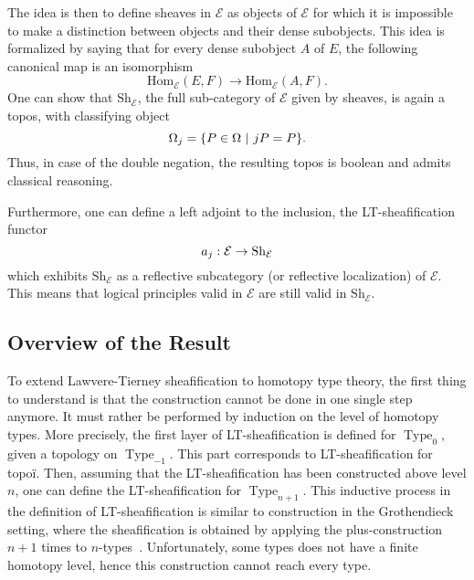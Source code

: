 \documentclass[preprint,9pt,numbers]{sigplanconf}
\DeclareMathOperator{\Type}{Type}
\newcommand \E {\mathcal{E}}
\newcommand \Hom[1] {\mathrm{Hom}_{#1}}
\newcommand \Sh[1] {\mathrm{Sh}_{#1}}
\newenvironment{mymath}[1][-0em]{%
  \newcommand\mymathaux{\vspace{#1}}%
  \vspace{#1}%
  \begin{equation*}%
  }{ %
    \mymathaux%
  \end{equation*}}
\begin{document}
The idea is then to define sheaves in $\E$ as objects of $\E$ for
which it is impossible to make a distinction between objects and their
dense subobjects. This idea is formalized by saying that for every
dense subobject $A$ of $E$, the following canonical map is an
isomorphism
%
\begin{equation}\label{equ:sheaf_def}
\Hom{\E}(E,F) \rightarrow \Hom{\E}(A,F).
\end{equation}%
%
One can show that $\Sh{\E}$, the full sub-category of $\E$ given by
sheaves, is again a topos, with classifying object
%
\begin{mymath}
\Omega_j = \{ P \in \Omega \ | \ j P  = P \}.
\end{mymath}%
%
Thus, in case of the double negation, the resulting topos is boolean  
and admits classical reasoning.

Furthermore, one can define a left adjoint to the inclusion, the
LT-sheafification functor
%
\begin{mymath}
a_j : \E \rightarrow \Sh{\E}
\end{mymath}%
which exhibits $\Sh{\E}$ as a reflective
subcategory (or reflective localization) of $\E$. This
means that logical principles valid in $\E$ are still valid in
$\Sh{\E}$.


\subsection{Overview of the Result}

To extend Lawvere-Tierney sheafification to homotopy type theory, the
first thing to understand is that the construction cannot be done in one
single step anymore. It must rather be performed by induction on the
level of homotopy types. More precisely, the first layer of
LT-sheafification is defined for $\Type_{0}$, given a topology on
$\Type_{-1}$. This part corresponds to LT-sheafification for topoï. Then,
assuming that the LT-sheafification has been constructed above level $n$,
one can define the LT-sheafification for $\Type_{n+1}$.
%
This inductive process in the definition of LT-sheafification is similar
to construction in the Grothendieck setting, where the
sheafification is obtained by applying the plus-construction $n\!+\!1$
times to
$n$-types~\cite[Chapter~6]{lurie}. Unfortunately, some types does not
have a finite homotopy level, hence this construction cannot reach
every type.
\end{document}
